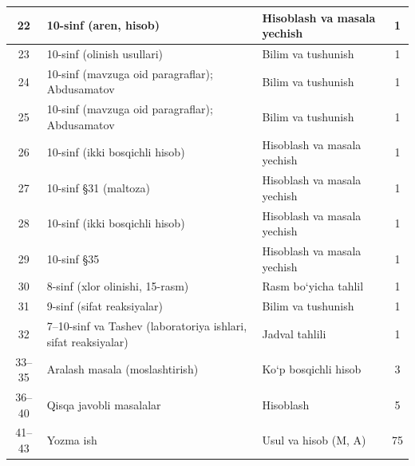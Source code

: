 \documentclass[11pt,a4paper]{article}
\begin{document}
{\begin{longtable}{|c|p{7.2cm}|p{5.4cm}|c|}
22 & 10-sinf (aren, hisob) & Hisoblash va masala yechish & 1\\\hline
23 & 10-sinf (olinish usullari) & Bilim va tushunish & 1\\\hline
24 & 10-sinf (mavzuga oid paragraflar); Abdusamatov & Bilim va tushunish & 1\\\hline
25 & 10-sinf (mavzuga oid paragraflar); Abdusamatov & Bilim va tushunish & 1\\\hline
26 & 10-sinf (ikki bosqichli hisob) & Hisoblash va masala yechish & 1\\\hline
27 & 10-sinf \S{}31 (maltoza) & Hisoblash va masala yechish & 1\\\hline
28 & 10-sinf (ikki bosqichli hisob) & Hisoblash va masala yechish & 1\\\hline
29 & 10-sinf \S{}35 & Hisoblash va masala yechish & 1\\\hline
30 & 8-sinf (xlor olinishi, 15-rasm) & Rasm bo`yicha tahlil & 1\\\hline
31 & 9-sinf (sifat reaksiyalar) & Bilim va tushunish & 1\\\hline
32 & 7--10-sinf va Tashev (laboratoriya ishlari, sifat reaksiyalar) & Jadval tahlili & 1\\\hline
33--35 & Aralash masala (moslashtirish) & Ko`p bosqichli hisob & 3\\\hline
36--40 & Qisqa javobli masalalar & Hisoblash & 5\\\hline
41--43 & Yozma ish & Usul va hisob (M, A) & 75\\\hline
\end{longtable}}
\end{document}
